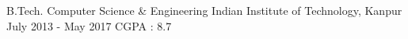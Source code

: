 
\begin{cventries}

  \cventry
    {B.Tech. Computer Science \& Engineering} %
    {Indian Institute of Technology, Kanpur} %
    {July 2013 - May 2017} %
    {} %
    {
    	CGPA : 8.7
    }
\end{cventries}
